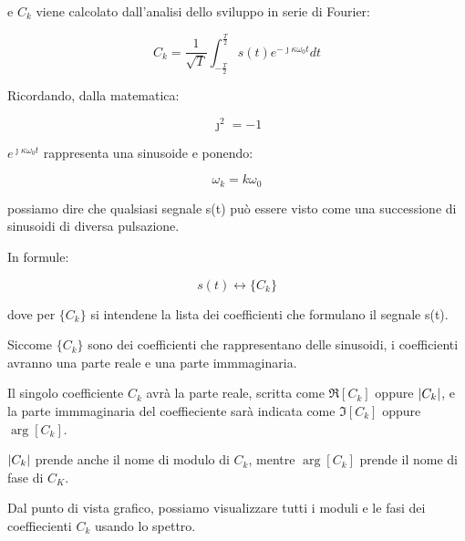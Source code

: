 e $C_k$ viene calcolato dall'analisi dello sviluppo in serie di Fourier: \newline

{
    \Large 
    \begin{equation}
        C_k 
        =
        \frac{1}{\sqrt{T}} \int_{-\frac{T}{2}}^{\frac{T}{2}} 
        s(t) e^{- \jmath \kappa \omega_0 t} dt
    \end{equation}
}

Ricordando, dalla matematica: 

{
    \Large 
    \begin{equation}
        \jmath ^{2} = -1 
    \end{equation}
}


 $e^{\jmath \kappa \omega_0 t}$ rappresenta una sinusoide e ponendo: 

{
    \Large 
    \begin{equation}
        \omega_k = k \omega_0
    \end{equation}
}

possiamo dire che qualsiasi segnale s(t) può essere visto come una 
successione di sinusoidi di diversa pulsazione. \newline 

In formule: 

{
    \Large 
    \begin{equation}
        s(t) \leftrightarrow \{C_k\}
    \end{equation}
}

dove per $\{C_k\}$ si intendene la lista dei coefficienti che formulano il segnale s(t). \newline 


Siccome $\{C_k\}$ sono dei coefficienti che rappresentano delle sinusoidi, 
i coefficienti avranno una parte reale e una parte immmaginaria. \newline 

Il singolo coefficiente $C_k$ avrà la parte reale, 
scritta come $\Re[C_k]$ oppure $\abs{C_k}$, e la parte immmaginaria del coeffieciente 
sarà indicata come $\Im[C_k]$ oppure $\arg[C_k]$. \newline 

$\abs{C_k}$ prende anche il nome di modulo di $C_k$, 
mentre $\arg[C_k]$ prende il nome di fase di $C_K$. \newline 

Dal punto di vista grafico, possiamo visualizzare tutti i moduli e le fasi dei coeffiecienti $C_k$ 
usando lo spettro. \newline 

